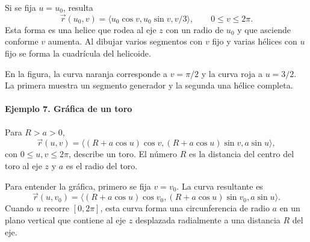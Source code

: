 Si se fija $u=u_0$, resulta
\[
\vec r(u_0,v)
=\langle u_0\cos v,u_0\sin v,v/3\rangle,
\qquad0\leq v\leq2\pi.
\]
Esta forma es una helice que rodea al eje $z$ con un radio de $u_0$ y que asciende conforme $v$ aumenta. Al dibujar varios segmentos con $v$ fijo y varias hélices con $u$ fijo se forma la cuadrícula del helicoide.

En la figura, la curva naranja corresponde a $v=\pi/2$ y la curva roja a $u=3/2$. La primera muestra un segmento generador y la segunda una hélice completa.

\begingroup\shorthandoff{>}
\begin{center}
\end{center}
\endgroup

\paragraph{Ejemplo 7. Gráfica de un toro}
Para $R>a>0$,
\[
\vec r(u,v)=\langle(R+a\cos u)\cos v,
(R+a\cos u)\sin v,a\sin u\rangle,
\]
con $0\leq u,v\leq2\pi$, describe un toro. El número $R$ es la distancia del centro del toro al eje $z$ y $a$ es el radio del toro.

Para entender la gráfica, primero se fija $v=v_0$. La curva resultante es
\[
\vec r(u,v_0)=
\langle(R+a\cos u)\cos v_0,
(R+a\cos u)\sin v_0,a\sin u\rangle.
\]
Cuando $u$ recorre $[0,2\pi]$, esta curva forma una circunferencia de radio $a$ en un plano vertical que contiene al eje $z$ desplazada radialmente a una distancia $R$ del eje.

